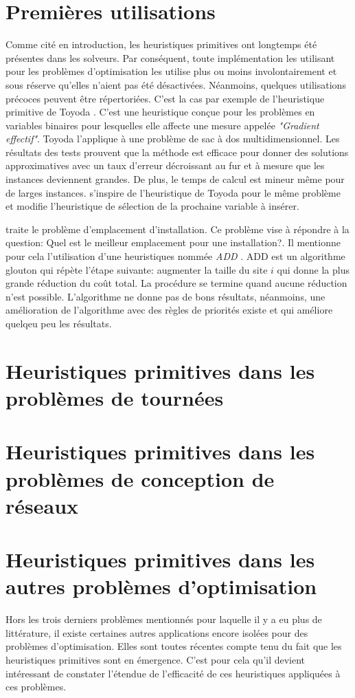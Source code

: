 \documentclass[12pt,a4paper,oneside]{book}
\theoremstyle{definition}
\begin{document}
	
	\section{Premières utilisations}
	Comme cité en introduction, les heuristiques primitives ont longtemps été présentes dans les solveurs. Par conséquent, toute implémentation les utilisant pour les problèmes d'optimisation les utilise plus ou moins involontairement et sous réserve qu'elles n'aient pas été désactivées. Néanmoins, quelques utilisations précoces peuvent être répertoriées. C'est la cas par exemple de l'heuristique primitive de Toyoda \cite{Toyoda1975}. C'est une heuristique conçue pour les problèmes en variables binaires pour lesquelles elle affecte une mesure appelée \textit{"Gradient effectif"}. Toyoda l'applique à une problème de sac à dos multidimensionnel. Les résultats des tests prouvent que la méthode est efficace pour donner des solutions approximatives avec un taux d'erreur décroissant au fur et à mesure que les instances deviennent grandes. De plus, le temps de calcul est mineur même pour de larges instances. 
	\cite{Loulou1979} s'inspire de l'heuristique de Toyoda pour le même problème et modifie l'heuristique de sélection de la prochaine variable à insérer.
	
	\cite{Holmberg} traite le problème d'emplacement d'installation. Ce problème vise à répondre à la question: Quel est le meilleur emplacement pour une installation?. Il mentionne pour cela l'utilisation d'une heuristiques nommée \textit{ADD} \cite{Domschke1985}. ADD est un algorithme glouton qui répète l'étape suivante: augmenter la taille du site $i$ qui donne la plus grande réduction du coût total. La procédure se termine quand aucune réduction n'est possible. L'algorithme ne donne pas de bons résultats, néanmoins, une amélioration de l'algorithme avec des règles de priorités existe et qui améliore quelqeu peu les résultats.

    
	\section{Heuristiques primitives dans les problèmes de tournées}
	    
	\section{Heuristiques primitives dans les problèmes de conception de réseaux}
	
	
	\section{Heuristiques primitives dans les autres problèmes d'optimisation}
	    Hors les trois derniers problèmes mentionnés pour laquelle il y a eu plus de littérature, il existe certaines autres applications encore isolées pour des problèmes d'optimisation. Elles sont toutes récentes compte tenu du fait que les heuristiques primitives sont en émergence. C'est pour cela qu'il devient intéressant de constater  l'étendue de l'efficacité de ces heuristiques appliquées à ces problèmes.
	    
\end{document}
